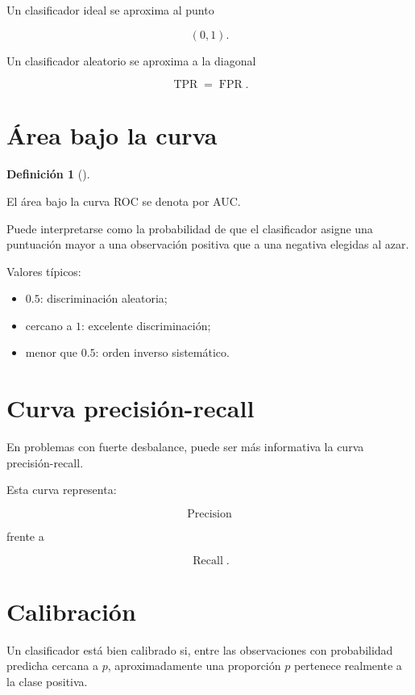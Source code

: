 \documentclass[
  spanish,
  11pt,
  letterpaper,
  DIV=11,
  numbers=noendperiod]{scrreprt}
\providecommand{\tightlist}{%
  \setlength{\itemsep}{0pt}\setlength{\parskip}{0pt}}
\theoremstyle{definition}
\newtheorem{definition}{Definición}[chapter]
\theoremstyle{plain}
\theoremstyle{definition}
\theoremstyle{remark}
\begin{document}
Un clasificador ideal se aproxima al punto

\[
(0,1).
\]

Un clasificador aleatorio se aproxima a la diagonal

\[
\operatorname{TPR}
=
\operatorname{FPR}.
\]

\section{Área bajo la curva}\label{uxe1rea-bajo-la-curva}

\begin{definition}[]\protect\hypertarget{def-auc}{}\label{def-auc}

El área bajo la curva ROC se denota por AUC.

\end{definition}

Puede interpretarse como la probabilidad de que el clasificador asigne
una puntuación mayor a una observación positiva que a una negativa
elegidas al azar.

Valores típicos:

\begin{itemize}
\tightlist
\item
  \(0.5\): discriminación aleatoria;
\item
  cercano a \(1\): excelente discriminación;
\item
  menor que \(0.5\): orden inverso sistemático.
\end{itemize}

\section{Curva precisión-recall}\label{curva-precisiuxf3n-recall}

En problemas con fuerte desbalance, puede ser más informativa la curva
precisión-recall.

Esta curva representa:

\[
\operatorname{Precision}
\]

frente a

\[
\operatorname{Recall}.
\]

\section{Calibración}\label{calibraciuxf3n}

Un clasificador está bien calibrado si, entre las observaciones con
probabilidad predicha cercana a \(p\), aproximadamente una proporción
\(p\) pertenece realmente a la clase positiva.
\end{document}
